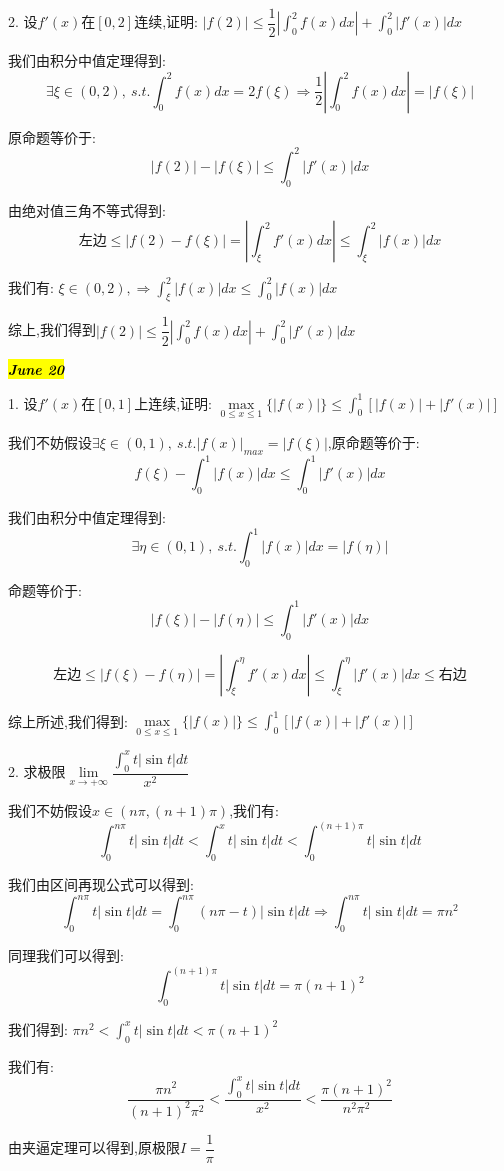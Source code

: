 2. 设$f'(x)$在$[0,2]$连续,证明: $|f(2)|\leq \dfrac{1}{2}|\int_{0}^{2}f(x)dx|+\int_{0}^{2}|f'(x)|dx$
\begin{solution}
	
	我们由积分中值定理得到: 
	$$\exists\xi\in(0,2),\ s.t. \int_{0}^{2}f(x)dx=2f(\xi)\Rightarrow \dfrac{1}{2}|\int_{0}^{2}f(x)dx|=|f(\xi)|$$
	
	原命题等价于: 
	$$|f(2)|-|f(\xi)|\leq \int_{0}^{2}|f'(x)|dx$$
	
	由绝对值三角不等式得到: 
	$$\text{左边}\leq |f(2)-f(\xi)|=|\int_{\xi}^{2}f'(x)dx|\leq \int_{\xi}^{2}|f(x)|dx$$
	
	我们有: $\xi\in(0,2),\Rightarrow \int_{\xi}^{2}|f(x)|dx\leq \int_{0}^{2}|f(x)|dx$
	
	综上,我们得到$|f(2)|\leq \dfrac{1}{2}|\int_{0}^{2}f(x)dx|+\int_{0}^{2}|f'(x)|dx$
\end{solution}

\hl{\textbf{\textit{June 20}}}

1. 设$f'(x)$在$[0,1]$上连续,证明: $\mathop{max}\limits_{0\leq x\leq 1}\{|f(x)|\}\leq \int_{0}^{1}[|f(x)|+|f'(x)|]$
\begin{solution}
	
	我们不妨假设$\exists \xi\in(0,1),\ s.t. |f(x)|_{max}=|f(\xi)|$,原命题等价于: 
	$$f(\xi)-\int_{0}^{1}|f(x)|dx\leq \int_{0}^{1}|f'(x)|dx$$
	
	我们由积分中值定理得到: 
	$$\exists\eta\in(0,1),\ s.t. \int_{0}^{1}|f(x)|dx=|f(\eta)|$$
	
	命题等价于: 
	$$|f(\xi)|-|f(\eta)|\leq \int_{0}^{1}|f'(x)|dx$$
	
	$$\text{左边}\leq |f(\xi)-f(\eta)|=|\int_{\xi}^{\eta}f'(x)dx|\leq \int_{\xi}^{\eta}|f'(x)|dx\leq\text{右边}$$
	
	综上所述,我们得到: $\mathop{max}\limits_{0\leq x\leq 1}\{|f(x)|\}\leq \int_{0}^{1}[|f(x)|+|f'(x)|]$
\end{solution}

2. 求极限$\lim\limits_{x\rightarrow+\infty}\dfrac{\int_{0}^{x}t|\sin t|dt}{x^2}$
\begin{solution}
	
	我们不妨假设$x\in(n\pi,(n+1)\pi)$,我们有: 
	$$\int_{0}^{n\pi}t|\sin t|dt< \int_{0}^{x}t|\sin t|dt<\int_{0}^{(n+1)\pi}t|\sin t|dt$$
	
	我们由区间再现公式可以得到: 
	$$\int_{0}^{n\pi}t|\sin t|dt=\int_{0}^{n\pi}(n\pi-t)|\sin t|dt\Rightarrow \int_{0}^{n\pi}t|\sin t|dt=\pi n^2$$
	
	同理我们可以得到: 
	$$\int_{0}^{(n+1)\pi}t|\sin t|dt=\pi (n+1)^2$$
	
	我们得到: $\pi n^2< \int_{0}^{x}t|\sin t|dt<\pi (n+1)^2$
	
	我们有: 
	$$\dfrac{\pi n^2}{(n+1)^2\pi^2}<\dfrac{\int_{0}^{x}t|\sin t|dt}{x^2}<\dfrac{\pi (n+1)^2}{n^2\pi^2}$$
	
	由夹逼定理可以得到,原极限$I=\dfrac{1}{\pi}$
\end{solution}

